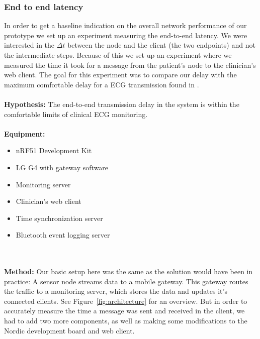 
\subsubsection{End to end latency} %
\label{ssub:end_to_end_latency}

In order to get a baseline indication on the overall network performance of our prototype we set up an experiment measuring the end-to-end latency. We were interested in the $\Delta t$ between the node and the client (the two endpoints) and not the intermediate steps. Because of this we set up an experiment where we measured the time it took for a message from the patient's node to the clinician's web client. The goal for this experiment was to compare our delay with the maximum comfortable delay for a ECG transmission found in \cite{Alesanco:2010kc}.
\\
\\
\noindent
\textbf{Hypothesis:} The end-to-end transmission delay in the system is within the comfortable limits of clinical ECG monitoring.
\\
\\
\noindent
\textbf{Equipment:} 
\begin{itemize}

  \item nRF51 Development Kit
  
  \item LG G4 with gateway software
  
  \item Monitoring server
  
  \item Clinician's web client 
  
  \item Time synchronization server

  \item Bluetooth event logging server
  
\end{itemize}
\\
\\
\noindent
\textbf{Method:} Our basic setup here was the same as the solution would have been in practice: A sensor node streams data to a mobile gateway. This gateway routes the traffic to a monitoring server, which stores the data and updates it's connected clients. See Figure~\ref{fig:architecture} for an overview. But in order to accurately measure the time a message was sent and received in the client, we had to add two more components, as well as making some modifications to the Nordic development board and web client.

